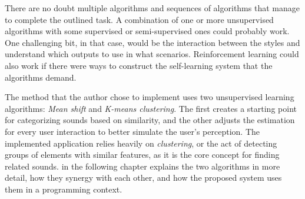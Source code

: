 There are no doubt multiple algorithms and sequences of algorithms that manage to complete the outlined task. A combination of one or more unsupervised algorithms with some supervised or semi-supervised ones could probably work. One challenging bit, in that case, would be the interaction between the styles and understand which outputs to use in what scenarios. Reinforcement learning could also work if there were ways to construct the self-learning system that the algorithms demand.

The method that the author chose to implement uses two unsupervised learning algorithms: \emph{Mean shift} and \emph{K-means clustering}. The first creates a starting point for categorizing sounds based on similarity, and the other adjusts the estimation for every user interaction to better simulate the user's perception. The implemented application relies heavily on \emph{clustering}, or the act of detecting groups of elements with similar features, as it is the core concept for finding related sounds.  in the following chapter explains the two algorithms in more detail, how they synergy with each other, and how the proposed system uses them in a programming context.

\egroup{}